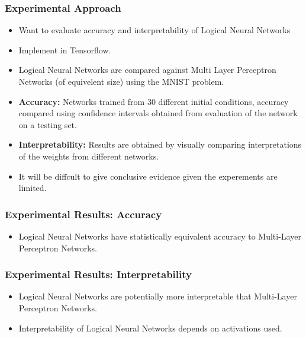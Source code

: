 \documentclass[]{beamer}
\begin{document}
\begin{frame}
\frametitle{Experimental Approach}

\begin{itemize}
\item Want to evaluate accuracy and interpretability of Logical Neural Networks
\item Implement in Tensorflow.
\item Logical Neural Networks are compared against Multi Layer Perceptron Networks (of equivelent size) using the MNIST problem.
\item \textbf{Accuracy:} Networks trained from 30 different initial conditions, accuracy compared using confidence intervals obtained from evaluation of the network on a testing set.
\item \textbf{Interpretability:} Results are obtained by visually comparing interpretations of the weights from different networks.
\item It will be diffcult to give conclusive evidence given the experements are limited.
\end{itemize}
\end{frame}

\begin{frame}
\frametitle{Experimental Results: Accuracy}

\begin{itemize}
\item Logical Neural Networks have statistically equivalent accuracy to Multi-Layer Perceptron Networks.
\end{itemize}
\end{frame}

\begin{frame}
\frametitle{Experimental Results: Interpretability}
\begin{itemize}
\item Logical Neural Networks are potentially more interpretable that Multi-Layer Perceptron Networks.
\item Interpretability of Logical Neural Networks depends on activations used.
\end{itemize}
\end{frame}
\end{document}
